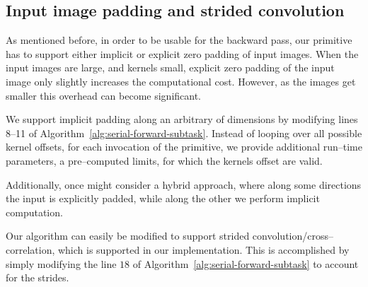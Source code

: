   \subsection{Input image padding and strided convolution}

  As mentioned before, in order to be usable for the backward pass,
  our primitive has to support either implicit or explicit zero
  padding of input images.  When the input images are large, and
  kernels small, explicit zero padding of the input image only
  slightly increases the computational cost.  However, as the images
  get smaller this overhead can become significant.

  We support implicit padding along an arbitrary of dimensions by
  modifying lines 8--11 of
  Algorithm~\ref{alg:serial-forward-subtask}.  Instead of looping over
  all possible kernel offsets, for each invocation of the primitive,
  we provide additional run--time parameters, a pre--computed limits,
  for which the kernels offset are valid.

  Additionally, once might consider a hybrid approach, where along
  some directions the input is explicitly padded, while along the
  other we perform implicit computation.

  Our algorithm can easily be modified to support strided
  convolution/cross--correlation, which is supported in our
  implementation.  This is accomplished by simply modifying the line
  $18$ of Algorithm~\ref{alg:serial-forward-subtask} to account for
  the strides.
